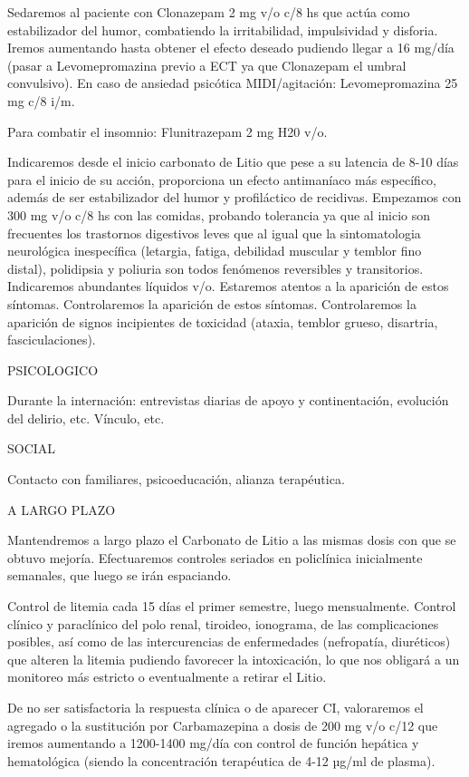 Sedaremos al paciente con Clonazepam 2 mg v/o c/8 hs que actúa como estabilizador del humor, combatiendo la irritabilidad, impulsividad y disforia. Iremos aumentando hasta obtener el efecto deseado pudiendo llegar a 16 mg/día (pasar a Levomepromazina previo a ECT ya que Clonazepam el umbral convulsivo). En caso de ansiedad psicótica MIDI/agitación: Levomepromazina 25 mg c/8 i/m.

Para combatir el insomnio: Flunitrazepam 2 mg H20 v/o.

Indicaremos desde el inicio carbonato de Litio que pese a su latencia de 8-10 días para el inicio de su acción, proporciona un efecto antimaníaco más específico, además de ser estabilizador del humor y profiláctico de recidivas. Empezamos con 300 mg v/o c/8 hs con las comidas, probando tolerancia ya que al inicio son frecuentes los trastornos digestivos leves que al igual que la sintomatologia neurológica inespecífica (letargia, fatiga, debilidad muscular y temblor fino distal), polidipsia y poliuria son todos fenómenos reversibles y transitorios. Indicaremos abundantes líquidos v/o. Estaremos atentos a la aparición de estos síntomas. Controlaremos la aparición de estos síntomas. Controlaremos la aparición de signos incipientes de toxicidad (ataxia, temblor grueso, disartria, fasciculaciones).


PSICOLOGICO

Durante la internación: entrevistas diarias de apoyo y continentación, evolución del delirio, etc. Vínculo, etc.

SOCIAL

Contacto con familiares, psicoeducación, alianza terapéutica.

A LARGO PLAZO

Mantendremos a largo plazo el Carbonato de Litio a las mismas dosis con que se obtuvo mejoría. Efectuaremos controles seriados en policlínica inicialmente semanales, que luego se irán espaciando.

Control de litemia cada 15 días el primer semestre, luego mensualmente. Control clínico y paraclínico del polo renal, tiroideo, ionograma, de las complicaciones posibles, así como de las intercurencias de enfermedades (nefropatía, diuréticos) que alteren la litemia pudiendo favorecer la intoxicación, lo que nos obligará a un monitoreo más estricto o eventualmente a retirar el Litio.

De no ser satisfactoria la respuesta clínica o de aparecer CI, valoraremos el agregado o la sustitución por Carbamazepina a dosis de 200 mg v/o c/12 que iremos aumentando a 1200-1400 mg/día con control de función hepática y hematológica (siendo la concentración terapéutica de 4-12 µg/ml de plasma).

